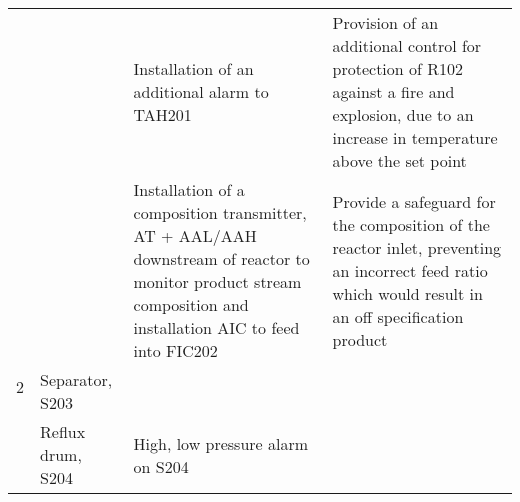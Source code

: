 \begin{table}[h]
\begin{tabularx}{\linewidth}{@{}lp{3cm}XX@{}}
     &                                            & \multirow[t]{2}{X}{Installation of an additional alarm to TAH201}                                                                                                & \multirow[t]{2}{X}{Provision of an additional control for protection of R102 against a fire and explosion, due to an increase in temperature above the set point}                                           \\
     &                                            &                                                                                                                                                               &                                                                                                                                                                                                                                                         \\ \cmidrule(l){3-4} 
     &                                            & Installation of a composition transmitter, AT + AAL/AAH downstream of reactor to monitor product stream composition and installation AIC to feed into FIC202  & Provide a safeguard for the composition of the reactor inlet, preventing an incorrect feed ratio which would result in an off specification product                                                   \\ \midrule
2    & \multirow[t]{2}{*}{Separator, S203}           &                                                                                                                                                               &                                                                                                                                                                                                                                                         \\ \cmidrule(l){3-4} 
     &                                            &                                                                                                                                                               &                                                                                                                                                                                                                                                         \\ \cmidrule(l){2-4} 
     & \multirow[t]{3}{*}{Reflux drum, S204}         & High, low pressure alarm on S204                                                                                                                              &                                                                                                                                                                                                                                                         \\ \cmidrule(l){3-4} 

\end{tabularx}
\end{table}
